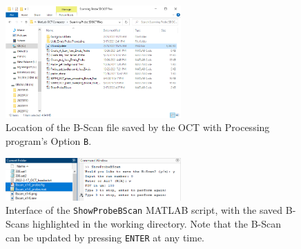 \documentclass{article}
\begin{document}
\begin{figure}[!h]
	\centering
	\includegraphics[width=0.6\textwidth]{Data for Probe Writeup/BScan location.png}
	\caption{Location of the B-Scan file saved by the OCT with Processing program's Option \texttt{B}.}\label{Bloc}
\end{figure}

\begin{figure}[!h]
	\centering
	\includegraphics[width=0.6\textwidth]{Data for Probe Writeup/ShowProbeBScan operation.png}
	\caption{Interface of the \texttt{ShowProbeBScan} MATLAB script, with the saved B-Scans highlighted in the working directory. Note that the B-Scan can be updated by pressing \texttt{ENTER} at any time.}\label{showprobebscan}
\end{figure}
\end{document}
